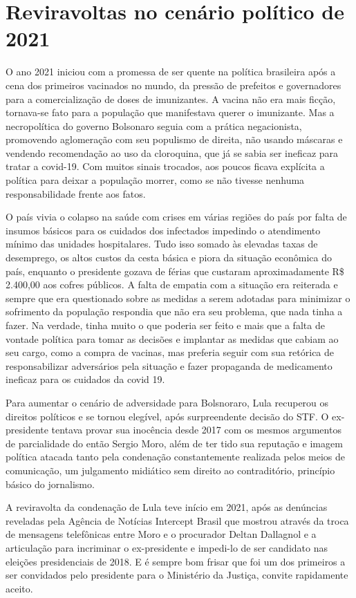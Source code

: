 \section{Reviravoltas no cenário político de 2021}

O ano 2021 iniciou com a promessa de ser quente na política brasileira
após a cena dos primeiros vacinados no mundo, da pressão de prefeitos e
governadores para a comercialização de doses de imunizantes. A vacina
não era mais ficção, tornava-se fato para a população que manifestava
querer o imunizante. Mas a necropolítica do governo Bolsonaro seguia com
a prática negacionista, promovendo aglomeração com seu populismo de
direita, não usando máscaras e vendendo recomendação ao uso da
cloroquina, que já se sabia ser ineficaz para tratar a covid-19. Com
muitos sinais trocados, aos poucos ficava explícita a política para
deixar a população morrer, como se não tivesse nenhuma responsabilidade
frente aos fatos.

O país vivia o colapso na saúde com crises em várias regiões do país por
falta de insumos básicos para os cuidados dos infectados impedindo o
atendimento mínimo das unidades hospitalares. Tudo isso somado às
elevadas taxas de desemprego, os altos custos da cesta básica e piora da
situação econômica do país, enquanto o presidente gozava de férias que
custaram aproximadamente R\$ 2.400,00 aos cofres públicos. A falta de
empatia com a situação era reiterada e sempre que era questionado sobre
as medidas a serem adotadas para minimizar o sofrimento da população
respondia que não era seu problema, que nada tinha a fazer. Na verdade,
tinha muito o que poderia ser feito e mais que a falta de vontade
política para tomar as decisões e implantar as medidas que cabiam ao seu
cargo, como a compra de vacinas, mas preferia seguir com sua retórica de
responsabilizar adversários pela situação e fazer propaganda de
medicamento ineficaz para os cuidados da covid 19.

Para aumentar o cenário de adversidade para Bolsnoraro, Lula recuperou
os direitos políticos e se tornou elegível, após surpreendente decisão
do STF. O ex-presidente tentava provar sua inocência desde 2017 com os
mesmos argumentos de parcialidade do então Sergio Moro, além de ter tido
sua reputação e imagem política atacada tanto pela condenação
constantemente realizada pelos meios de comunicação, um julgamento
midiático sem direito ao contraditório, princípio básico do jornalismo.

A reviravolta da condenação de Lula teve início em 2021, após as
denúncias reveladas pela Agência de Notícias Intercept Brasil que
mostrou através da troca de mensagens telefônicas entre Moro e o
procurador Deltan Dallagnol e a articulação para incriminar o
ex-presidente e impedi-lo de ser candidato nas eleições presidenciais de
2018. E é sempre bom frisar que foi um dos primeiros a ser convidados
pelo presidente para o Ministério da Justiça, convite rapidamente
aceito.

